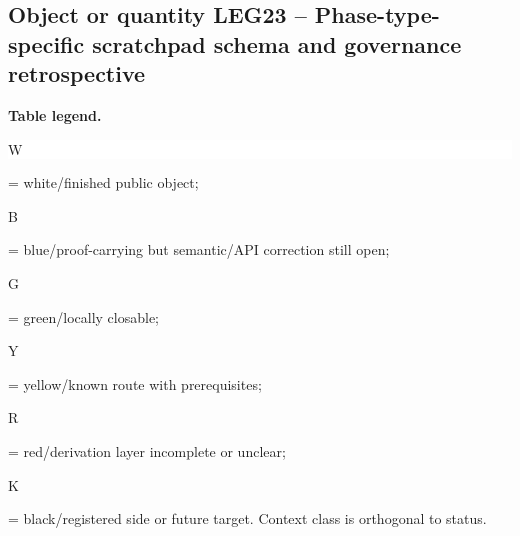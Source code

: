 \subsection*{Object or quantity LEG23 -- Phase-type-specific scratchpad schema and governance retrospective}
\hypertarget{objproof:LEG23}{}
\par\smallskip\noindent\begin{minipage}{0.99\linewidth}\footnotesize\raggedright\textbf{Table legend.} \colorbox{white}{\strut W} = white/finished public object; \colorbox{cyan!20}{\strut B} = blue/proof-carrying but semantic/API correction still open; \colorbox{green!18}{\strut G} = green/locally closable; \colorbox{yellow!25}{\strut Y} = yellow/known route with prerequisites; \colorbox{red!20}{\strut R} = red/derivation layer incomplete or unclear; \colorbox{black!18}{\strut K} = black/registered side or future target. Context class is orthogonal to status.\end{minipage}\par\vspace{0.25em}
